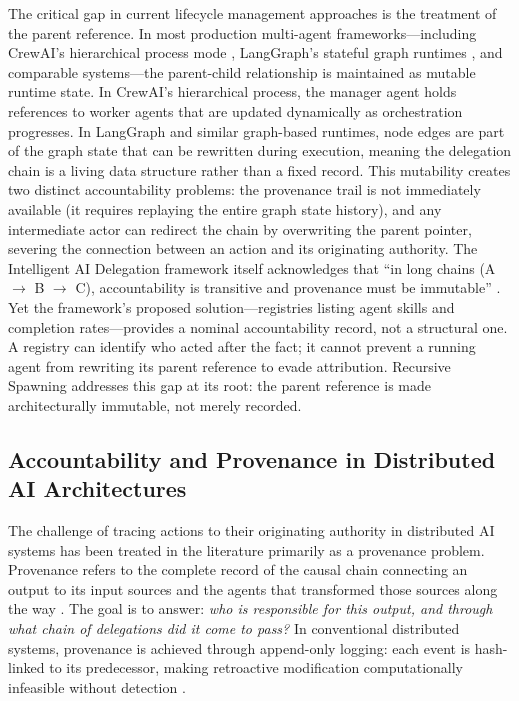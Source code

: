 The critical gap in current lifecycle management approaches is the treatment of the parent reference. In most production multi-agent frameworks---including CrewAI's hierarchical process mode \cite{crewai2024}, LangGraph's stateful graph runtimes \cite{langchain2023}, and comparable systems---the parent-child relationship is maintained as mutable runtime state. In CrewAI's hierarchical process, the manager agent holds references to worker agents that are updated dynamically as orchestration progresses. In LangGraph and similar graph-based runtimes, node edges are part of the graph state that can be rewritten during execution, meaning the delegation chain is a living data structure rather than a fixed record. This mutability creates two distinct accountability problems: the provenance trail is not immediately available (it requires replaying the entire graph state history), and any intermediate actor can redirect the chain by overwriting the parent pointer, severing the connection between an action and its originating authority. The Intelligent AI Delegation framework itself acknowledges that ``in long chains (A $\rightarrow$ B $\rightarrow$ C), accountability is transitive and provenance must be immutable'' \cite{arxiv2602.11865}. Yet the framework's proposed solution---registries listing agent skills and completion rates---provides a nominal accountability record, not a structural one. A registry can identify who acted after the fact; it cannot prevent a running agent from rewriting its parent reference to evade attribution. Recursive Spawning addresses this gap at its root: the parent reference is made architecturally immutable, not merely recorded.

\subsection{Accountability and Provenance in Distributed AI Architectures}\label{sec:provenance}

The challenge of tracing actions to their originating authority in distributed AI systems has been treated in the literature primarily as a provenance problem. Provenance refers to the complete record of the causal chain connecting an output to its input sources and the agents that transformed those sources along the way \cite{on_chain_provenance_ai}. The goal is to answer: \emph{who is responsible for this output, and through what chain of delegations did it come to pass?} In conventional distributed systems, provenance is achieved through append-only logging: each event is hash-linked to its predecessor, making retroactive modification computationally infeasible without detection \cite{blockchain_ai_governance}.

